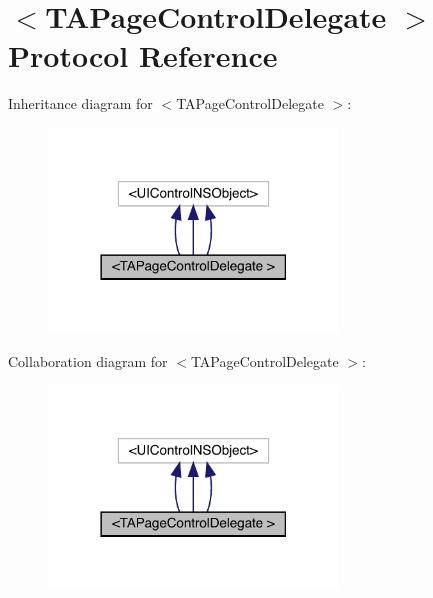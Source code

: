 \hypertarget{protocol_t_a_page_control_delegate_01-p}{}\section{$<$T\+A\+Page\+Control\+Delegate $>$ Protocol Reference}
\label{protocol_t_a_page_control_delegate_01-p}


Inheritance diagram for $<$T\+A\+Page\+Control\+Delegate $>$\+:\nopagebreak
\begin{figure}[H]
\begin{center}
\leavevmode
\includegraphics[width=218pt]{protocol_t_a_page_control_delegate_01-p__inherit__graph}
\end{center}
\end{figure}


Collaboration diagram for $<$T\+A\+Page\+Control\+Delegate $>$\+:\nopagebreak
\begin{figure}[H]
\begin{center}
\leavevmode
\includegraphics[width=218pt]{protocol_t_a_page_control_delegate_01-p__coll__graph}
\end{center}
\end{figure}
